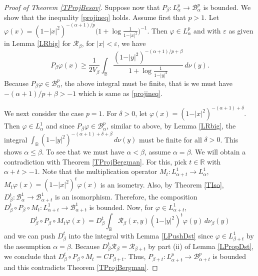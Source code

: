 \documentclass{amsart}
\theoremstyle{definition}
\theoremstyle{remark}
\begin{document}
\begin{proof}[Proof of Theorem \ref{TProjBesov}]
Suppose now that $P_\beta\colon L^p_\alpha\to\mathcal B^p_\alpha$ is bounded.
We show that the inequality \eqref{projineq} holds.
Assume first that $p>1$.
Let $\varphi(x)=(1-\vert x\vert^2)^{-(\alpha+1)/p}
\bigl(1+\log\frac{1}{1-\vert x\vert^2}\bigr)^{-1}$.
Then $\varphi\in L^p_\alpha$ and with $\varepsilon$ as given in Lemma \ref{LRbig}
for $\mathcal R_\beta$,
for $\vert x\vert<\varepsilon$, we have
\begin{equation*}
P_\beta\varphi(x)\ge \frac{1}{2V_\beta}\int_{\mathbb B}
\frac{(1-\vert y\vert^2)^{-(\alpha+1)/p+\beta}}
{1+\log\frac{1}{1-\vert y\vert^2}}\,d\nu(y).
\end{equation*}
Because $P_\beta\varphi\in\mathcal B^p_\alpha$, the above integral
must be finite, that is we must have $-(\alpha+1)/p+\beta>-1$ which
is same as \eqref{projineq}.

We next consider the case $p=1$.
For $\delta>0$, let $\varphi(x)=(1-\vert x\vert^2)^{-(\alpha+1)+\delta}$.
Then $\varphi\in L^1_\alpha$ and since $P_\beta\varphi\in\mathcal B^p_\alpha$,
similar to above, by Lemma \ref{LRbig}, the integral
$\int_{\mathbb B}(1-\vert y\vert^2)^{-(\alpha+1)+\delta+\beta}\,d\nu(y)$
must be finite for all $\delta>0$.
This shows $\alpha\le\beta$.
To see that we must have $\alpha<\beta$, assume $\alpha=\beta$.
We will obtain a contradiction with Theorem \ref{TProjBergman}.
For this, pick $t\in\mathbb R$ with $\alpha+t>-1$.
Note that the multiplication operator $M_t\colon L^1_{\alpha+t}\to L^1_\alpha$,
$M_t\varphi(x)=(1-\vert x\vert^2)^t\varphi(x)$ is an isometry.
Also, by Theorem \ref{TIso},
$D^t_\beta\colon \mathcal B^1_\alpha\to\mathcal B^1_{\alpha+t}$
is an isomorphism.
Therefore, the composition
$D^t_\beta\circ P_\beta\circ M_t\colon
L^1_{\alpha+t}\to\mathcal B^1_{\alpha+t}$
is bounded.
Now, for $\varphi\in L^1_{\alpha+t}$,
\begin{equation*}
D^t_\beta\circ P_\beta\circ M_t\varphi(x)
=D^t_\beta\int_{\mathbb B}
\mathcal R_\beta(x,y)(1-\vert y\vert^2)^t\varphi(y)\,d\nu_\beta(y)
\end{equation*}
and we can push $D^t_\beta$ into the integral with Lemma \ref{LPushDst}
since $\varphi\in L^1_{\beta+t}$ by the assumption $\alpha=\beta$.
Because $D^t_\beta\mathcal R_\beta=\mathcal R_{\beta+t}$ by part (ii) of
Lemma \ref{LPropDst}, we conclude that
$D^t_\beta\circ P_\beta\circ M_t=C P_{\beta+t}$.
Thus, $P_{\beta+t}\colon L^p_{\alpha+t}\to\mathcal B^p_{\alpha+t}$ is
bounded and this contradicts Theorem \ref{TProjBergman}.
\end{proof}
\end{document}
